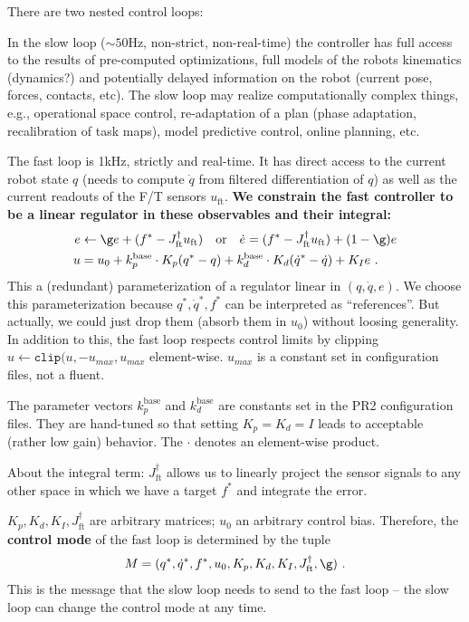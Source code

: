 \documentclass[10pt,fleqn,twoside]{article}
\newcommand{\ft}{\text{ft}}
\begin{document}
{{There are two nested control loops:

In the slow loop ($\sim 50$Hz, non-strict, non-real-time) the
controller has full access to the results of pre-computed
optimizations, full models of the robots kinematics (dynamics?) and
potentially delayed information on the robot (current pose, forces,
contacts, etc). The slow loop may realize computationally complex
things, e.g., operational space control, re-adaptation of a plan
(phase adaptation, recalibration of task maps), model predictive
control, online planning, etc.

The fast loop is 1kHz, strictly and real-time. It has direct access to
the current robot state $q$ (needs to compute $\dot q$ from filtered
differentiation of $q$) as well as the current readouts of the F/T
sensors $u_\ft$. \textbf{We constrain the fast controller to be a linear
regulator in these observables and their integral:}
\begin{align}
e
&\gets \g e + (f^* - J_\ft^\dag u_\ft)
  \quad\text{or}\quad \dot e = (f^*-J_\ft^\dag u_\ft) + (1-\g)e\\
u
&= u_0 + k_p^\text{base} \cdot K_p (q^* - q) + k_d^\text{base} \cdot K_d (\dot q^* - \dot q) + K_I e ~.
\end{align}
This a (redundant) parameterization of a regulator linear in $(q, \dot
q, e)$. We choose this parameterization because $q^*, \dot q^*, f^*$
can be interpreted as ``references''. But actually, we could just drop
them (absorb them in $u_0$) without loosing generality. In addition to
this, the fast loop respects control limits by clipping
$u \gets \texttt{clip}(u, -u_{max}, u_{max}$ element-wise. $u_{max}$
is a constant set in configuration files, not a
fluent. 

The parameter vectors $k_p^\text{base}$ and $k_d^\text{base}$ are
constants set in the PR2 configuration files. They are hand-tuned so
that setting $K_p=K_d=I$ leads to acceptable (rather low gain)
behavior. The $\cdot$ denotes an element-wise product.

About the integral term: $J_\ft^\dag$ allows us to linearly project the
sensor signals to any other space in which we have a target $f^*$ and
integrate the error.

$K_p, K_d, K_I, J_\ft^\dag$ are arbitrary matrices; $u_0$ an arbitrary
control bias. Therefore, the \textbf{control mode} of the fast loop is
determined by the tuple
\begin{align}
M = (q^*, \dot q^*, f^*, u_0, K_p, K_d, K_I, J_\ft^\dag, \g) ~.
\end{align}
This is the message that the slow loop needs to send to the fast loop
-- the slow loop can change the control mode at any time.

}}
\end{document}
